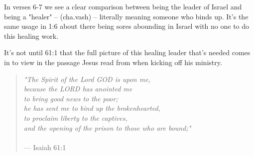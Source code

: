 \documentclass[11pt]{article}
\begin{document}

In verses 6-7 we see a clear comparison between being the leader of Israel and being a "healer" –  (cha.vash) – literally
meaning someone who binds up. It's the same usage in 1:6 about there being sores abounding in Israel with no one to do this healing work.

{\vspace{1em}}

It's not until 61:1 that the full picture of this healing leader that's needed comes in to view in the passage Jesus read from
when kicking off his ministry.

{\vspace{1em}}

\begin{quote}
\textit{"The Spirit of the Lord GOD is upon me,\\ because the LORD has anointed me\\to bring good news to the poor;\\ he has sent me to bind up the brokenhearted,\\ to proclaim liberty to the captives,\\ and the opening of the prison to those who are bound;"}\\\\
\hfill --- Isaiah 61:1
\end{quote}
\end{document}
